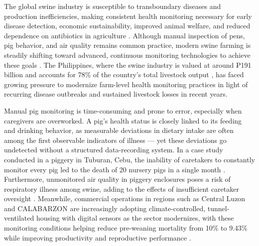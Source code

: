 The global swine industry is susceptible to transboundary diseases and production inefficiencies, making consistent health monitoring necessary for early disease detection, economic sustainability, improved animal welfare, and reduced dependence on antibiotics in agriculture \cite{beyondtech2025smart}. Although manual inspection of pens, pig behavior, and air quality remains common practice, modern swine farming is steadily shifting toward advanced, continuous monitoring technologies to achieve these goals \cite{beyondtech2025smart}. The Philippines, where the swine industry is valued at around ₱191 billion and accounts for 78\% of the country's total livestock output \cite{lo2025rebooting}\cite{livestockproduction2026}, has faced growing pressure to modernize farm-level health monitoring practices in light of recurring disease outbreaks and sustained livestock losses in recent years.

Manual pig monitoring is time-consuming and prone to error, especially when caregivers are overworked. A pig's health status is closely linked to its feeding and drinking behavior, as measurable deviations in dietary intake are often among the first observable indicators of illness — yet these deviations go undetected without a structured data-recording system. In a case study conducted in a piggery in Tuburan, Cebu, the inability of caretakers to constantly monitor every pig led to the death of 20 nursery pigs in a single month \cite{dingcong2017monitoring}. Furthermore, unmonitored air quality in piggery enclosures poses a risk of respiratory illness among swine, adding to the effects of insufficient caretaker oversight \cite{lo2025rebooting}\cite{livestockproduction2026}. Meanwhile, commercial operations in regions such as Central Luzon and CALABARZON are increasingly adopting climate-controlled, tunnel-ventilated housing with digital sensors as the sector modernizes, with these monitoring conditions helping reduce pre-weaning mortality from 10\% to 9.43\% while improving productivity and reproductive performance \cite{lo2025rebooting}\cite{livestockproduction2026}.
